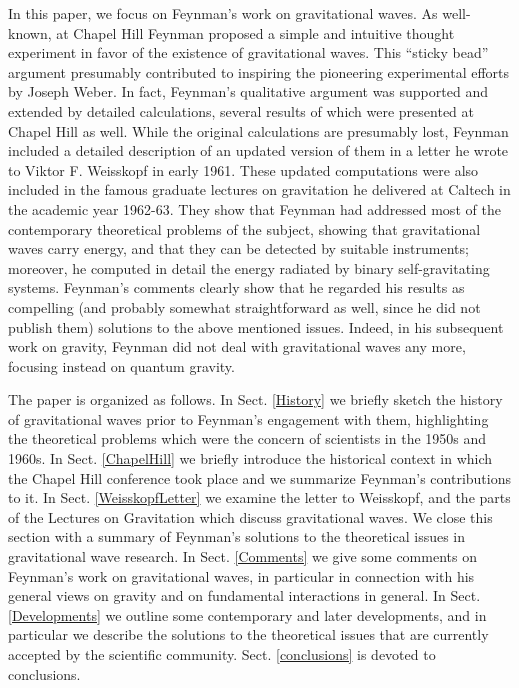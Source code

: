 \documentclass{ws-procs961x669}            %
\begin{document}
In this paper, we focus on Feynman's work on gravitational waves.
As well-known, at Chapel Hill Feynman proposed a simple and
intuitive thought experiment in favor of the existence of
gravitational waves. This ``sticky bead'' argument presumably
contributed to inspiring the pioneering experimental efforts by
Joseph Weber. In fact, Feynman's qualitative argument was
supported and extended by detailed calculations, several results
of which were presented at Chapel Hill as well. While the original
calculations are presumably lost, Feynman included a detailed
description of an updated version of them in a letter he wrote to
Viktor F. Weisskopf in early 1961\cite{WeisskopfLetter}. These
updated computations were also included in the famous graduate
lectures on gravitation he delivered at Caltech in the academic
year 1962-63\cite{Feynman:1996kb}. They show that Feynman had
addressed most of the contemporary theoretical problems of the
subject, showing that gravitational waves carry energy, and that
they can be detected by suitable instruments; moreover, he
computed in detail the energy radiated by binary self-gravitating
systems. Feynman's comments clearly show that he regarded his
results as compelling (and probably somewhat straightforward as
well, since he did not publish them) solutions to the above
mentioned issues. Indeed, in his subsequent work on gravity,
Feynman did not deal with gravitational waves any more, focusing
instead on quantum gravity.


The paper is organized as follows.  In Sect. \ref{History} we
briefly sketch the history of gravitational waves prior to
Feynman's engagement with them, highlighting the theoretical
problems which were the concern of scientists in the 1950s and
1960s. In Sect. \ref{ChapelHill} we briefly introduce the
historical context in which the Chapel Hill conference took place
and we summarize Feynman's contributions to it. In Sect.
\ref{WeisskopfLetter} we examine the letter to Weisskopf, and the
parts of the Lectures on Gravitation which discuss gravitational
waves. We close this section with a summary of Feynman's solutions
to the theoretical issues in gravitational wave research. In Sect.
\ref{Comments} we give some comments on Feynman's work on
gravitational waves, in particular in connection with his general
views on gravity and on fundamental interactions in general. In
Sect. \ref{Developments} we outline some contemporary and later
developments, and in particular we describe the solutions to the
theoretical issues that are currently accepted by the scientific
community. Sect. \ref{conclusions} is devoted to conclusions.
\end{document}
